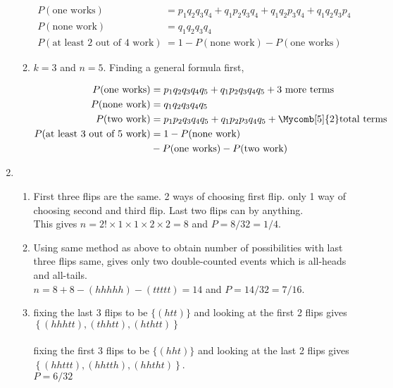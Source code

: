 \begin{enumerate}
\begin{enumerate}
		
			\begin{align}
				P(\text{one works}) &= p_1 q_2 q_3 q_4 + q_1 p_2 q_3 q_4 + q_1 q_2 p_3 q_4 + q_1 q_2 q_3 p_4 \\
				P(\text{none work}) &= q_1 q_2 q_3 q_4 \\
				P(\text{at least 2 out of 4 work}) &= 1 - P(\text{none work}) - P(\text{one works})
			\end{align}
		
		
		\item $ k = 3 $ and $ n = 5 $. Finding a general formula first, 
		
		
			\begin{align}
				P(\text{one works}) &= p_1 q_2 q_3 q_4 q_5 + q_1 p_2 q_3 q_4 q_5 + \text{3 more terms} \\
				P(\text{none work}) &= q_1 q_2 q_3 q_4 q_5\\
				P(\text{two work}) &= p_1 p_2 q_3 q_4 q_5 + q_1 p_2 p_3 q_4 q_5 + \Mycomb[5]{2}\text{total terms} \\
				P(\text{at least 3 out of 5 work}) &= 1 - P(\text{none work}) \nonumber \\
				&- P(\text{one works}) - P(\text{two work})
			\end{align}
		
	\end{enumerate}
	
	\item \begin{enumerate}
		\item First three flips are the same. 2 ways of choosing first flip. only 1 way of choosing second and third flip. Last two flips can by anything. \\
		This gives $ n = 2! \times 1 \times 1 \times 2 \times 2  = 8$ and $ P = 8/32 = 1/4 $. \\
		
		\item Using same method as above to obtain number of possibilities with last three flips same, gives only two double-counted events which is all-heads and all-tails. \\
		$ n = 8 + 8 - (hhhhh) - (ttttt)  = 14$ and $ P = 14/32 = 7/16 $.\\
		
		\item fixing the last 3 flips to be $ \{ (htt) \} $ and looking at the first 2 flips gives \\
		$ \left\{ (hhhtt), (thhtt), (hthtt) \right\} $ \\\\
		fixing the first 3 flips to be $ \{ (hht) \} $ and looking at the last 2 flips gives \\
		$ \left\{ (hhttt), (hhtth), (hhtht) \right\} $. \\
		$ P = 6/32 $\\
	\end{enumerate}
	

\end{enumerate}
